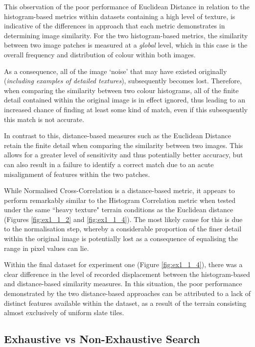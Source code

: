 This observation of the poor performance of Euclidean Distance in relation to the histogram-based metrics within datasets containing a high level of texture, is indicative of the differences in approach that each metric demonstrates in determining image similarity. For the two histogram-based metrics, the similarity between two image patches is measured at a \textit{global} level, which in this case is the overall frequency and distribution of colour within both images. 

As a consequence, all of the image `noise' that may have existed originally (\textit{including examples of detailed textures}), subsequently becomes lost. Therefore, when comparing the similarity between two colour histograms, all of the finite detail contained within the original image is in effect ignored, thus leading to an increased chance of finding at least some kind of match, even if this subsequently this match is not accurate. 

In contrast to this, distance-based measures such as the Euclidean Distance retain the finite detail when comparing the similarity between two images. This allows for a greater level of sensitivity and thus potentially better accuracy, but can also result in a failure to identify a correct match due to an acute misalignment of features within the two patches.

While Normalised Cross-Correlation is a distance-based metric, it appears to perform remarkably similar to the Histogram Correlation metric when tested under the same ``heavy texture" terrain conditions as the Euclidean distance (Figures \ref{fig:ex1_1_2} and \ref{fig:ex1_1_4}). The most likely cause for this is due to the normalisation step, whereby a considerable proportion of the finer detail within the original image is potentially lost as a consequence of equalising the range in pixel values can lie. 

Within the final dataset for experiment one (Figure \ref{fig:ex1_1_4}), there was a clear difference in the level of recorded displacement between the histogram-based and distance-based similarity measures. In this situation, the poor performance demonstrated by the two distance-based approaches can be attributed to a lack of distinct features available within the dataset, as a result of the terrain consisting almost exclusively of uniform slate tiles.

\subsection{Exhaustive vs Non-Exhaustive Search}

